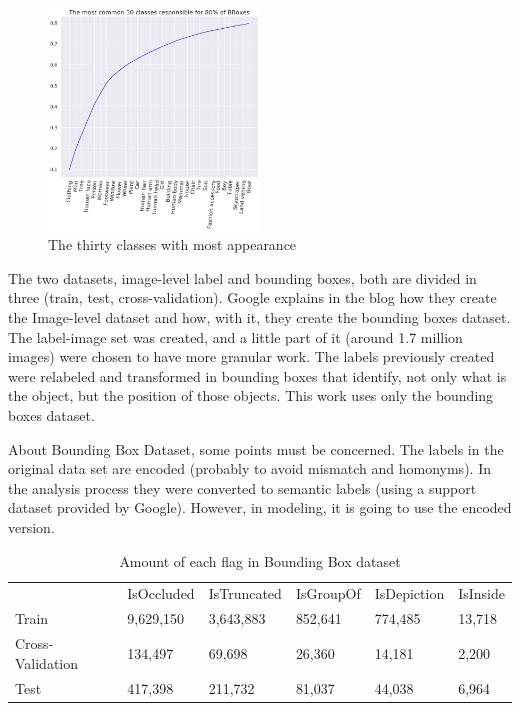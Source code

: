 \documentclass[11pt, a4paper, twocolumn]{article}
\begin{document}
\begin{figure}[!ht]
	\centering
	\includegraphics[width=0.5\textwidth]{30-most-frequently.png}
	\caption{\scriptsize The thirty classes with most appearance}
\end{figure}

The two datasets, image-level label and bounding boxes, both are divided in three (train, test, cross-validation). Google explains in the blog \cite{imgdataset} how they create the Image-level dataset and how, with it, they create the bounding boxes dataset. The label-image set was created, and a little part of it (around 1.7 million images) were chosen to have more granular work. The labels previously created were relabeled and transformed in bounding boxes that identify, not only what is the object, but the position of those objects. This work uses only the bounding boxes dataset.

About Bounding Box Dataset, some points must be concerned.
The labels in the original data set are encoded (probably to avoid mismatch and homonyms). In the analysis process they were converted to semantic labels (using a support dataset provided by Google). However, in modeling, it is going to use the encoded version. 

\begin{table}[!ht]
	\footnotesize
	\centering
	\caption{ \footnotesize Amount of each flag in Bounding Box dataset }
	\label{table2}
	\begin{tabular}{llllll}
		& IsOccluded & IsTruncated & IsGroupOf & IsDepiction & IsInside \\
		\rowcolor[HTML]{EFEFEF} 
		Train            & 9,629,150  & 3,643,883   & 852,641   & 774,485     & 13,718   \\
		Cross-Validation & 134,497    & 69,698      & 26,360    & 14,181      & 2,200    \\
		\rowcolor[HTML]{EFEFEF} 
		Test             & 417,398    & 211,732     & 81,037    & 44,038      & 6,964   
	\end{tabular}
\end{table}
\end{document}
